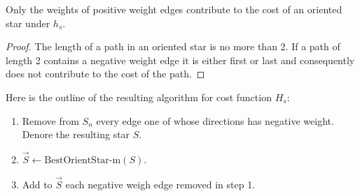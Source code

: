   \begin{lemma}
  	Only  the weights of positive weight edges contribute to the cost of an oriented star 
  	under $h_s$.
  \end{lemma} 
\begin{proof}
	The length of a path in an oriented star is no more than 2. If a path of length 2 contains a negative weight edge it is either first or last and consequently does not contribute to the cost of the path. 
\end{proof}

Here is the outline of the resulting algorithm for cost function $H_s$:
\begin{enumerate}
	\item Remove from $S_n$ every edge one of whose directions has negative weight. Denore the resulting star $S$.
	\item $\vec{S}\leftarrow \mbox{BestOrientStar-m} (S)$.
	\item Add to $\vec{S}$ each negative weigh edge removed in step 1.
\end{enumerate}
